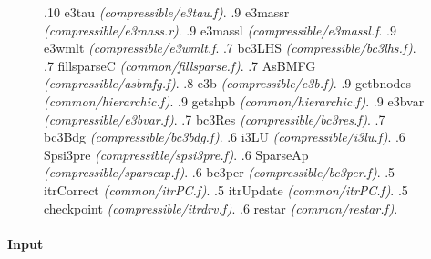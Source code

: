 \documentclass{ucb}
\begin{document}
\begin{figure}[p]
{{{                                                .10 e3tau \textit{(compressible/e3tau.f)}.
                                            .9 e3massr \textit{(compressible/e3mass.r)}.
                                            .9 e3massl \textit{(compressible/e3massl.f}.
                                            .9 e3wmlt \textit{(compressible/e3wmlt.f}.
                                    .7 bc3LHS \textit{(compressible/bc3lhs.f)}.
                                    .7 fillsparseC \textit{(common/fillsparse.f)}.
                                    .7 AsBMFG \textit{(compressible/asbmfg.f)}.
                                        .8 e3b \textit{(compressible/e3b.f)}.
                                            .9 getbnodes \textit{(common/hierarchic.f)}.
                                            .9 getshpb  \textit{(common/hierarchic.f)}.
                                            .9 e3bvar \textit{(compressible/e3bvar.f)}.
                                    .7 bc3Res \textit{(compressible/bc3res.f)}.
                                    .7 bc3Bdg \textit{(compressible/bc3bdg.f)}.
                                .6 i3LU \textit{(compressible/i3lu.f)}.
                                .6 Spsi3pre \textit{(compressible/spsi3pre.f)}.
                                .6 SparseAp \textit{(compressible/sparseap.f)}.
                                .6 bc3per \textit{(compressible/bc3per.f)}.
                            .5 itrCorrect \textit{(common/itrPC.f)}.
                            .5 itrUpdate \textit{(common/itrPC.f)}.
                            .5 checkpoint \textit{(compressible/itrdrv.f)}.
                            .6 restar \textit{(common/restar.f)}.
        }
    }}
\end{figure}

\pagebreak

\paragraph{Input}
\end{document}
